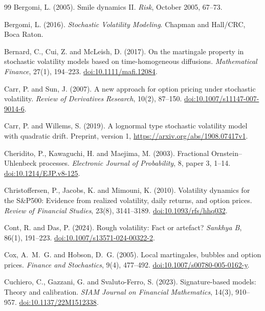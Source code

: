 \documentclass[11pt,a4paper]{article}
\theoremstyle{definition}
\theoremstyle{remark}
\begin{document}
\begin{thebibliography}{99}
Bergomi, L. (2005).
Smile dynamics II.
\emph{Risk}, October 2005, 67--73.

Bergomi, L. (2016).
\emph{Stochastic Volatility Modeling}.
Chapman and Hall/CRC, Boca Raton.

Bernard, C., Cui, Z. and McLeish, D. (2017).
On the martingale property in stochastic volatility models based on time-homogeneous diffusions.
\emph{Mathematical Finance}, 27(1), 194--223.
\href{https://doi.org/10.1111/mafi.12084}{doi:10.1111/mafi.12084}.

Carr, P. and Sun, J. (2007).
A new approach for option pricing under stochastic volatility.
\emph{Review of Derivatives Research}, 10(2), 87--150.
\href{https://doi.org/10.1007/s11147-007-9014-6}{doi:10.1007/s11147-007-9014-6}.

Carr, P. and Willems, S. (2019).
A lognormal type stochastic volatility model with quadratic drift.
Preprint, version 1, \url{https://arxiv.org/abs/1908.07417v1}.

Cheridito, P., Kawaguchi, H. and Maejima, M. (2003).
Fractional Ornstein--Uhlenbeck processes.
\emph{Electronic Journal of Probability}, 8, paper 3, 1--14.
\href{https://doi.org/10.1214/EJP.v8-125}{doi:10.1214/EJP.v8-125}.

Christoffersen, P., Jacobs, K. and Mimouni, K. (2010).
Volatility dynamics for the S\&P500: Evidence from realized volatility, daily returns, and option prices.
\emph{Review of Financial Studies}, 23(8), 3141--3189.
\href{https://doi.org/10.1093/rfs/hhq032}{doi:10.1093/rfs/hhq032}.

Cont, R. and Das, P. (2024).
Rough volatility: Fact or artefact?
\emph{Sankhya B}, 86(1), 191--223.
\href{https://doi.org/10.1007/s13571-024-00322-2}{doi:10.1007/s13571-024-00322-2}.

Cox, A.~M.~G. and Hobson, D.~G. (2005).
Local martingales, bubbles and option prices.
\emph{Finance and Stochastics}, 9(4), 477--492.
\href{https://doi.org/10.1007/s00780-005-0162-y}{doi:10.1007/s00780-005-0162-y}.

Cuchiero, C., Gazzani, G. and Svaluto-Ferro, S. (2023).
Signature-based models: Theory and calibration.
\emph{SIAM Journal on Financial Mathematics}, 14(3), 910--957.
\href{https://doi.org/10.1137/22M1512338}{doi:10.1137/22M1512338}.


\end{thebibliography}
\end{document}
